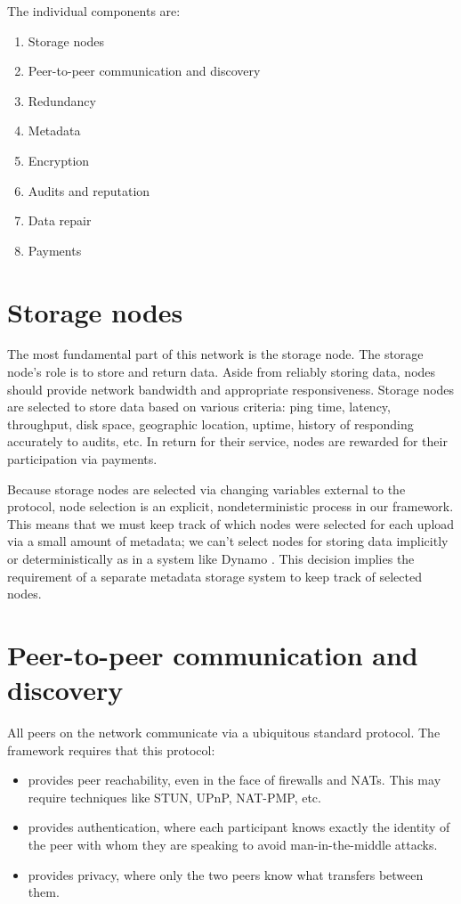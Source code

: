 \documentclass[11pt,fleqn,openany]{book}
\begin{document}
The individual components are:

\begin{enumerate}
\item Storage nodes
\item Peer-to-peer communication and discovery
\item Redundancy
\item Metadata
\item Encryption
\item Audits and reputation
\item Data repair
\item Payments
\end{enumerate}

\section{Storage nodes}

The most fundamental part of this network is the storage node.
The storage node's role is to store and return data.
Aside from reliably storing data, nodes should provide
network bandwidth and appropriate responsiveness.
Storage nodes are selected to store data based on various criteria: ping time,
latency, throughput, disk space, geographic location, uptime, history of
responding accurately to audits, etc.
In return for their service, nodes are rewarded for their participation via
payments.

Because storage
nodes are selected via changing variables external to the protocol, node
selection is an explicit, nondeterministic process in our framework. This means
that we must keep track of which nodes were selected for each upload via a
small amount of metadata; we can't select nodes for storing data implicitly or
deterministically as in a system like Dynamo \cite{dynamo}. This decision
implies the requirement of a separate metadata storage system to keep track
of selected nodes.

\section{Peer-to-peer communication and discovery}

All peers on the network communicate via a ubiquitous standard protocol. The
framework requires that this protocol:

\begin{itemize}
\item provides peer reachability, even in the face of firewalls
and NATs. This may require techniques like STUN, UPnP, NAT-PMP, etc.
\item provides authentication, where each participant knows
exactly the identity of the peer with whom they are speaking to avoid
man-in-the-middle attacks.
\item provides privacy, where only the two peers
know what transfers between them.
\end{itemize}
\end{document}
